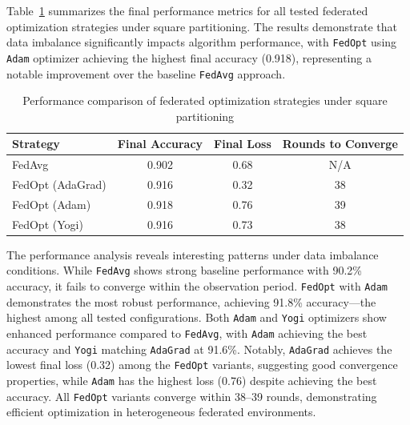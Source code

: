 \documentclass[11pt]{article}
\begin{document}
    Table~\ref{tab:square_performance} summarizes the final performance metrics for all tested federated optimization strategies under square partitioning. The results demonstrate that data imbalance significantly impacts algorithm performance, with \texttt{FedOpt} using \texttt{Adam} optimizer achieving the highest final accuracy (0.918), representing a notable improvement over the baseline \texttt{FedAvg} approach.

    \begin{table}[h]
        \centering
        \caption{Performance comparison of federated optimization strategies under square partitioning}
        \label{tab:square_performance}
        \begin{tabular}{|l|c|c|c|}
            \hline
            \textbf{Strategy} & \textbf{Final Accuracy} & \textbf{Final Loss} & \textbf{Rounds to Converge} \\
            \hline
            FedAvg            & 0.902                   & 0.68                & N/A                         \\
            FedOpt (AdaGrad)  & 0.916                   & 0.32                & 38                          \\
            FedOpt (Adam)     & 0.918                   & 0.76                & 39                          \\
            FedOpt (Yogi)     & 0.916                   & 0.73                & 38                          \\
            \hline
        \end{tabular}
    \end{table}

    The performance analysis reveals interesting patterns under data imbalance conditions. While \texttt{FedAvg} shows strong baseline performance with 90.2\% accuracy, it fails to converge within the observation period. \texttt{FedOpt} with \texttt{Adam} demonstrates the most robust performance, achieving 91.8\% accuracy---the highest among all tested configurations. Both \texttt{Adam} and \texttt{Yogi} optimizers show enhanced performance compared to \texttt{FedAvg}, with \texttt{Adam} achieving the best accuracy and \texttt{Yogi} matching \texttt{AdaGrad} at 91.6\%. Notably, \texttt{AdaGrad} achieves the lowest final loss (0.32) among the \texttt{FedOpt} variants, suggesting good convergence properties, while \texttt{Adam} has the highest loss (0.76) despite achieving the best accuracy. All \texttt{FedOpt} variants converge within 38--39 rounds, demonstrating efficient optimization in heterogeneous federated environments.
\end{document}
